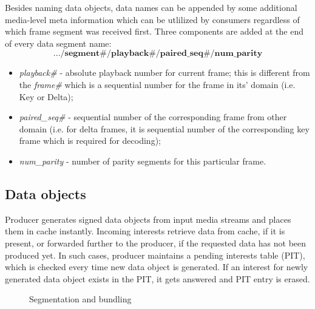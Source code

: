 \documentclass[10pt]{proc}
\begin{document}
Besides naming data objects, data names can be appended by some additional media-level meta information which can be utlilized by consumers regardless of which frame segment was received first. Three components are added at the end of every data segment name:
\small\begin{equation}
.../\textbf{segment\#}/\textbf{playback\#}/\textbf{paired\_seq\#}/\textbf{num\_parity} \nonumber
\end{equation}\normalsize
\begin{itemize}
\item \textit{playback\#} - absolute playback number for current frame; this is different from the \textit{frame\#} which is a sequential number for the frame in its' domain (i.e. Key or Delta);
\item \textit{paired\_seq\#} - sequential number of the corresponding frame from other domain (i.e. for delta frames, it is sequential number of the corresponding key frame which is required for decoding);
\item \textit{num\_parity} - number of parity segments for this particular frame.
\end{itemize}


\subsection{Data objects}
Producer generates signed data objects from input media streams and places them in cache instantly. Incoming interests retrieve data from cache, if it is present, or forwarded further to the producer, if the requested data has not been produced yet. In such cases, producer maintains a pending interests table (PIT), which is checked every time new data object is generated. If an interest for newly generated data object exists in the PIT, it gets answered and PIT entry is erased.

\begin{figure}[t!]
\centering


\caption{Segmentation and bundling}

\end{figure}
\end{document}

